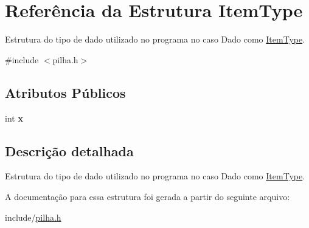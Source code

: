 \hypertarget{struct_item_type}{}\section{Referência da Estrutura Item\+Type}
\label{struct_item_type}


Estrutura do tipo de dado utilizado no programa no caso Dado como \mbox{\hyperlink{struct_item_type}{Item\+Type}}.  




{\ttfamily \#include $<$pilha.\+h$>$}

\subsection*{Atributos Públicos}
\begin{DoxyCompactItemize}
\item 
\mbox{\label{struct_item_type_ac607cb8d69e5763265e33fda4c1867a7}} 
int {\bfseries x}
\end{DoxyCompactItemize}


\subsection{Descrição detalhada}
Estrutura do tipo de dado utilizado no programa no caso Dado como \mbox{\hyperlink{struct_item_type}{Item\+Type}}. 

A documentação para essa estrutura foi gerada a partir do seguinte arquivo\+:\begin{DoxyCompactItemize}
\item 
include/\mbox{\hyperlink{pilha_8h}{pilha.\+h}}\end{DoxyCompactItemize}
